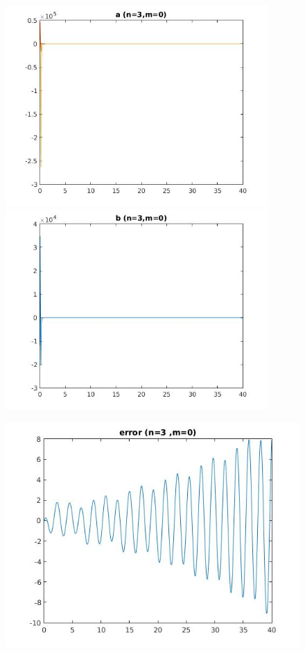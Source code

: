 \documentclass{article}
\begin{document}
\clearpage
\large
\begin{figure}[h!]
\centering 
 	  \begin{minipage}{0.48\textwidth}
     \centering
     \advance\leftskip-4cm
  \includegraphics[width=100mm,scale=2]{assets/try30o.jpg}
   \end{minipage} \hfill
    \begin{minipage}{0.48\textwidth}
  \includegraphics[width=100mm,scale=2]{assets/try30oo.jpg}
  \end{minipage}
\end{figure}
\begin{figure}[h!]
\centering
\advance\leftskip-0.5cm
 \includegraphics[width=130mm,scale=2]{assets/try30ooo.jpg}
\end{figure}
\end{document}
